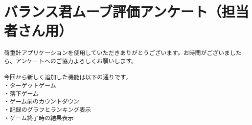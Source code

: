 \documentclass[uplatex,a4paper,12pt]{jsreport}
\begin{document}
\chapter{バランス君ムーブ評価アンケート（担当者さん用）}\label{h:tantou}

\begin{verbatim}
荷重計アプリケーションを使用していただきありがとうございます。お時間がございましたら、アンケートへのご協力よろしくお願いします。

今回から新しく追加した機能は以下の通りです。
・ターゲットゲーム
・落下ゲーム
・ゲーム前のカウントダウン
・記録のグラフとランキング表示
・ゲーム終了時の結果表示
\end{verbatim}
\end{document}
